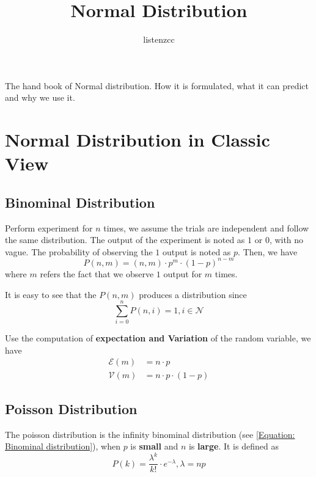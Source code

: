 

\newtheorem{theorem}{Theorem}[section]
\newtheorem{lemma}{Lemma}[section]
\newtheorem{proposition}{Proposition}[section]

\title{Normal Distribution}
\author{listenzcc}



\maketitle

\abstract
The hand book of Normal distribution.
How it is formulated, what it can predict and why we use it.

\tableofcontents

\section{Normal Distribution in Classic View}

\subsection{Binominal Distribution}
Perform experiment for $n$ times, we assume the trials are independent and follow the same distribution.
The output of the experiment is noted as $1$ or $0$, with no vague.
The probability of observing the $1$ output is noted as $p$.
Then, we have
\begin{equation}
    \label{Equation: Binominal distribution}
    P(n, m) = (n, m) \cdot p^{m} \cdot (1-p)^{n-m}
\end{equation}
where $m$ refers the fact that we observe $1$ output for $m$ times.

It is easy to see that the $P(n, m)$ produces a distribution since
\begin{equation*}
    \sum_{i=0}^{n} P(n, i) = 1, i \in \mathcal{N}
\end{equation*}

Use the computation of \textbf{expectation and Variation} of the random variable, we have
\begin{align*}
    \mathcal{E} (m) & = n \cdot p             \\
    \mathcal{V} (m) & = n \cdot p \cdot (1-p)
\end{align*}

\subsection{Poisson Distribution}
The poisson distribution is the infinity binominal distribution (see \eqref{Equation: Binominal distribution}),
when $p$ is \textbf{small} and $n$ is \textbf{large}.
It is defined as
\begin{equation}
    \label{Equation: Poisson distribution}
    P(k) = \frac{\lambda^k}{k!} \cdot e^{-\lambda}, \lambda=np
\end{equation}

